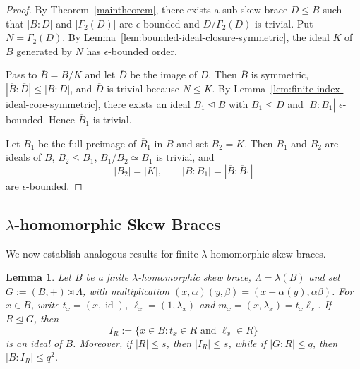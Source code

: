 \documentclass[11pt, oneside]{amsart}
\numberwithin{equation}{section}
\theoremstyle{plain}
\newtheorem{lem}[equation]{Lemma}
\theoremstyle{definition}
\begin{document}
\begin{proof}
By Theorem~\ref{maintheorem}, there exists a sub-skew brace $D\leqslant B$ such that $|B:D|$ and $|\Gamma_2(D)|$ are $\epsilon$-bounded and $D/\Gamma_2(D)$ is trivial. Put $N=\Gamma_2(D)$. By Lemma~\ref{lem:bounded-ideal-closure-symmetric}, the ideal $K$ of $B$ generated by $N$ has $\epsilon$-bounded order.

Pass to $\overline B=B/K$ and let $\overline D$ be the image of $D$. Then $\overline B$ is symmetric, $|\overline B:\overline D|\leqslant |B:D|$, and $\overline D$ is trivial because $N\leqslant K$. By Lemma~\ref{lem:finite-index-ideal-core-symmetric}, there exists an ideal $\overline B_1\trianglelefteq\overline B$ with $\overline B_1\leqslant\overline D$ and $|\overline B:\overline B_1|$ $\epsilon$-bounded. Hence $\overline B_1$ is trivial.

Let $B_1$ be the full preimage of $\overline B_1$ in $B$ and set $B_2=K$. Then $B_1$ and $B_2$ are ideals of $B$, $B_2\leqslant B_1$, $B_1/B_2\simeq\overline B_1$ is trivial, and
$$
|B_2|=|K|,\qquad |B:B_1|=|\overline B:\overline B_1|
$$
are $\epsilon$-bounded.
\end{proof}



\subsection{$\lambda$-homomorphic Skew Braces}

We now establish analogous results for finite $\lambda$-homomorphic skew braces.

\begin{lem}\label{lem:lambda-homomorphic-bridge}
Let $B$ be a finite $\lambda$-homomorphic skew brace,  $\Lambda=\lambda(B)$ and set $G:=(B,+)\rtimes\Lambda$, with multiplication $(x,\alpha)(y,\beta)=(x+\alpha(y),\alpha\beta)$. For $x\in B$, write $t_x=(x,\operatorname{id})$, $\ell_x=(1,\lambda_x)$ and $m_x=(x,\lambda_x)=t_x\ell_x$. If $R\unlhd G$, then
$$
I_R:=\{x\in B:t_x\in R\text{ and }\ell_x\in R\}
$$
is an ideal of $B$. Moreover, if $|R|\leqslant s$, then $|I_R|\leqslant s$, while if $|G:R|\leqslant q$, then $|B:I_R|\leqslant q^2$.
\end{lem}
\end{document}
